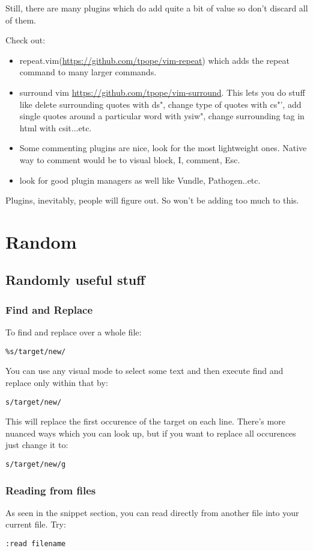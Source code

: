 \documentclass[12pt, letterpaper]{article}
\begin{document}
Still, there are many plugins which do add quite a bit of value so don't discard all of them.

Check out: 
\begin{itemize}
    \item repeat.vim(\url{https://github.com/tpope/vim-repeat}) which adds the repeat command to many larger commands.
    \item surround vim \url{https://github.com/tpope/vim-surround}. This lets you do stuff like delete surrounding quotes with ds", change type of quotes with cs"', add single quotes around a particular word with ysiw", change surrounding tag in html with csit...etc.
    \item Some commenting plugins are nice, look for the most lightweight ones. Native way to comment would be to visual block, I, comment, Esc.
    \item look for good plugin managers as well like Vundle, Pathogen..etc.
\end{itemize}


Plugins, inevitably, people will figure out. So won't be adding too much to this.


\section{Random}
\subsection{Randomly useful stuff}

\subsubsection{Find and Replace}
To find and replace over a whole file:
\begin{verbatim}
%s/target/new/
\end{verbatim}

You can use any visual mode to select some text and then execute find and replace only within that by:
\begin{verbatim}
s/target/new/
\end{verbatim}
This will replace the first occurence of the target on each line. There's more nuanced ways which you can look up, but if you want to replace all occurences just change it to:
\begin{verbatim}
s/target/new/g
\end{verbatim}

\subsubsection{Reading from files}
As seen in the snippet section, you can read directly from another file into your current file. Try:
\begin{verbatim}
:read filename
\end{verbatim}
\end{document}

